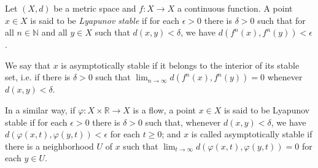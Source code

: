 \documentclass[12pt]{article}
\newcommand{\R}{\mathbb{R}}
\newcommand{\N}{\mathbb{N}}
\begin{document}
Let $(X,d)$ be a metric space and $f\colon X\to X$ a continuous function. A point $x\in X$ is said to be \emph{Lyapunov stable} if for each $\epsilon>0$ there is $\delta>0$ such that for all $n\in \N$ and all $y\in X$ such that $d(x,y)<\delta$, we have  $d(f^n(x),f^n(y))<\epsilon$.

We say that $x$ is asymptotically stable if it belongs to the interior of its stable set, i.e. if there is $\delta>0$ such that $\lim_{n\to\infty} d(f^n(x),f^n(y))=0$ whenever $d(x,y)<\delta$.

In a similar way, if $\varphi\colon X\times \R\to X$ is a flow, a point $x\in X$ is said to be Lyapunov stable if for each $\epsilon>0$ there is $\delta>0$ such that, whenever $d(x,y)<\delta$, we have $d(\varphi(x,t),\varphi(y,t))<\epsilon$ for each $t\geq 0$; and $x$ is called asymptotically stable if there is a neighborhood $U$ of $x$ such that $\lim_{t\to\infty} d(\varphi(x,t),\varphi(y,t)) = 0$ for each $y\in U$.
\end{document}
